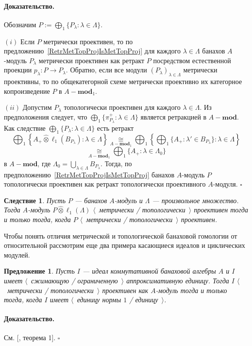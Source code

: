\documentclass[12pt]{article}
\newcommand{\projtens}{\mathbin{\widehat{\otimes}}}
\newcommand{\isom}[1]{\mathop{\mathbin{\cong}}\limits_{#1}}
\newtheorem{proposition}[theorem]{Предложение}
\newtheorem{corollary}[theorem]{Следствие}
\renewenvironment{proof}{\paragraph{Доказательство.}}{\hfill$\square$\medskip}
\begin{document}
\begin{proof} Обозначим $P:=\bigoplus_1 \{P_\lambda:\lambda\in\Lambda \}$.

    $(i)$ Если $P$ метрически проективен, то по
    предложению~\ref{RetrMetTopProjIsMetTopProj} для каждого $\lambda\in\Lambda$
    банахов $A$-модуль $P_\lambda$ метрически проективен как ретракт $P$
    посредством естественной проекции $p_\lambda:P\to P_\lambda$. Обратно, если
    все модули ${(P_\lambda)}_{\lambda\in\Lambda}$ метрически проективны, то по
    общекатегорной схеме метрически проективно их категорное копроизведение $P$
    в $A-\mathbf{mod}_1$.

    $(ii)$ Допустим $P_\lambda$ топологически проективен для каждого
    $\lambda\in\Lambda$. Из предположения следует, что 	$\bigoplus_1
        \{\pi_{P_\lambda}^+:\lambda\in\Lambda \}$ является ретракцией в
    $A-\mathbf{mod}$. Как следствие $\bigoplus_1 \{P_\lambda:\lambda\in\Lambda
        \}$ есть ретракт
    $$
        \bigoplus\nolimits_1\left \{
        A_+\projtens \ell_1(B_{P_\lambda}):\lambda\in\Lambda\right \}
        \isom{A-\mathbf{mod}_1}
        \bigoplus\nolimits_1\left \{
        \bigoplus\nolimits_1
        \{A_+:\lambda'\in B_{P_\lambda} \}:\lambda\in\Lambda\right \}
    $$
    $$
        \isom{A-\mathbf{mod}_1}
        \bigoplus\nolimits_1 \{A_+:\lambda\in\Lambda_0 \}
    $$
    в $A-\mathbf{mod}$, где
    $\Lambda_0=\bigcup_{\lambda\in\Lambda}B_{P_\lambda}$. Тогда, по
    предположению~\ref{RetrMetTopProjIsMetTopProj} банахов $A$-модуль $P$
    топологически проективен как ретракт топологически проективного $A$-модуля.
\end{proof}

\begin{corollary}\label{MetTopProjTensProdWithl1} Пусть $P$ --- банахов
    $A$-модуль и $\Lambda$ --- произвольное множество. Тогда $A$-модуль
    $P\projtens \ell_1(\Lambda)$ $\langle$~метрически / топологически~$\rangle$
    проективен тогда и только тогда, когда $P$ $\langle$~метрически /
    топологически~$\rangle$ проективен.
\end{corollary}

Чтобы понять отличия метрической и топологической банаховой гомологии от
относительной рассмотрим еще два примера касающиеся идеалов и циклических
модулей.

\begin{proposition}\label{GoodCommIdealMetTopProjIsUnital} Пусть $I$ --- идеал
    коммутативной банаховой алгебры $A$ и $I$ имеет $\langle$~сжимающую /
    ограниченную~$\rangle$ аппроксимативную единицу. Тогда $I$
    $\langle$~метрически / топологически~$\rangle$ проективен как $A$-модуль
    тогда и только тогда, когда $I$ имеет $\langle$~единицу нормы $1$ /
    единицу~$\rangle$.
\end{proposition}
\begin{proof} См. [\cite{NemMetTopProjIdBanAlg}, теорема 1].
\end{proof}
\end{document}
